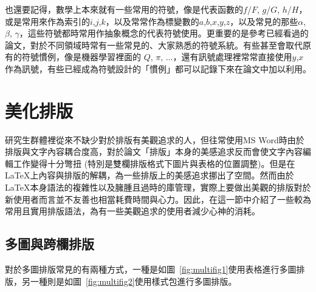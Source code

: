 \documentclass[12pt]{report}
\theoremstyle{plain}
\begin{document}
也還要記得，數學上本來就有一些常用的符號，像是代表函數的$f$/$F$, $g$/$G$, $h$/$H$，或是常用來作為索引的$i$,$j$,$k$，以及常常作為標變數的$a$,$b$,$x$,$y$,$z$，以及常見的那些$\alpha$, $\beta$, $\gamma$，這些符號都時常用作抽象概念的代表符號使用。更重要的是參考已經看過的論文，對於不同領域時常有一些常見的、大家熟悉的符號系統。有些甚至會取代原有的符號慣例，像是機器學習裡面的 $Q$, $\pi$, $\dots$，還有訊號處理裡常常直接使用$y$,$x$作為訊號，有些已經成為符號設計的「慣例」都可以記錄下來在論文中加以利用。

\section{美化排版}

研究生群體裡從來不缺少對於排版有美觀追求的人，但往常使用MS Word時由於排版與文字內容耦合度高，對於論文「排版」本身的美感追求反而會使文字內容編輯工作變得十分彆扭 (特別是雙欄排版格式下圖片與表格的位置調整)。但是在\LaTeX 上內容與排版的解耦，為一些排版上的美感追求挪出了空間。然而由於\LaTeX 本身語法的複雜性以及臃腫且過時的庫管理，實際上要做出美觀的排版對於新使用者而言並不友善也相當耗費時間與心力。因此，在這一節中介紹了一些較為常用且實用排版語法，為有一些美觀追求的使用者減少心神的消耗。

\subsection{多圖與跨欄排版}

對於多圖排版常見的有兩種方式，一種是如圖~\ref{fig:multifig1}使用表格進行多圖排版，另一種則是如圖~\ref{fig:multifig2}使用樣式包進行多圖排版。
\end{document}
